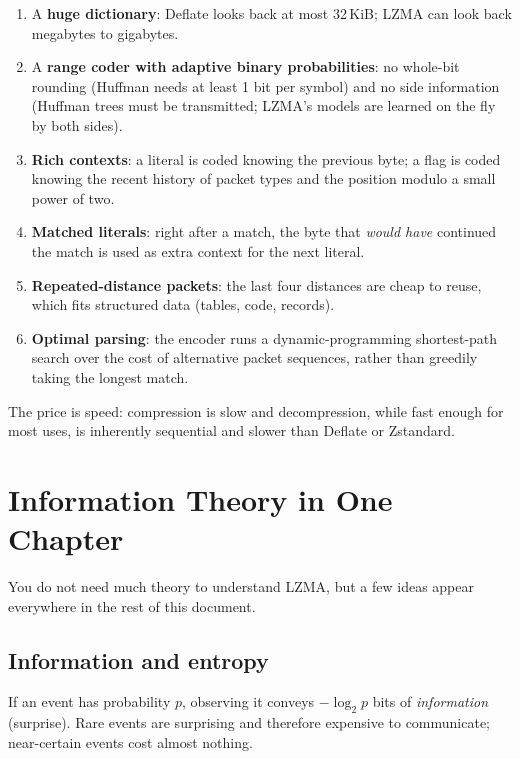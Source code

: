 \documentclass[11pt,a4paper,oneside]{book}
\begin{document}
\begin{enumerate}
\item A \textbf{huge dictionary}: Deflate looks back at most 32\,KiB; LZMA can look back megabytes to gigabytes.
\item A \textbf{range coder with adaptive binary probabilities}: no whole-bit rounding (Huffman needs at least 1 bit per
  symbol) and no side information (Huffman trees must be transmitted; LZMA's models are learned on the fly by both sides).
\item \textbf{Rich contexts}: a literal is coded knowing the previous byte; a flag is coded knowing the recent history of
  packet types and the position modulo a small power of two.
\item \textbf{Matched literals}: right after a match, the byte that \emph{would have} continued the match is used as extra
  context for the next literal.
\item \textbf{Repeated-distance packets}: the last four distances are cheap to reuse, which fits structured data
  (tables, code, records).
\item \textbf{Optimal parsing}: the encoder runs a dynamic-programming shortest-path search over the cost of
  alternative packet sequences, rather than greedily taking the longest match.
\end{enumerate}

The price is speed: compression is slow and decompression, while fast enough for most uses, is inherently sequential
and slower than Deflate or Zstandard.

\chapter{Information Theory in One Chapter}

You do not need much theory to understand LZMA, but a few ideas appear everywhere in the rest of this document.

\section{Information and entropy}

If an event has probability $p$, observing it conveys $-\log_2 p$ bits of \emph{information} (surprise). Rare events are
surprising and therefore expensive to communicate; near-certain events cost almost nothing.
\end{document}

